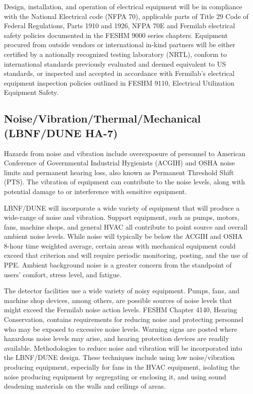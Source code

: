Design, installation, and operation of electrical equipment will be in
compliance with the National Electrical code (NFPA 70), applicable
parts of Title 29 Code of Federal Regulations, Parts 1910 and 1926,
NFPA 70E and Fermilab electrical safety policies documented in the
FESHM 9000 series chapters. Equipment procured from outside vendors or
international in-kind partners will be either certified by a
nationally recognized testing laboratory (NRTL), conform to
international standards previously evaluated and deemed equivalent to
US standards, or inspected and accepted in accordance with Fermilab’s
electrical equipment inspection policies outlined in FESHM 9110,
Electrical Utilization Equipment Safety.


\subsection{Noise/Vibration/Thermal/Mechanical (LBNF/DUNE HA-7)}

Hazards from noise and vibration include overexposure of personnel to
American Conference of Governmental Industrial Hygienists (ACGIH) and
OSHA noise limits and permanent hearing loss, also known as Permanent
Threshold Shift (PTS). The vibration of equipment can contribute to
the noise levels, along with potential damage to or interference with
sensitive equipment.

LBNF/DUNE will incorporate a wide variety of equipment that will
produce a wide-range of noise and vibration. Support equipment, such
as pumps, motors, fans, machine shops, and general HVAC all contribute
to point source and overall ambient noise levels. While noise will
typically be below the ACGIH and OSHA 8-hour time weighted average,
certain areas with mechanical equipment could exceed that criterion
and will require periodic monitoring, posting, and the use of
PPE. Ambient background noise is a greater concern from the standpoint
of users’ comfort, stress level, and fatigue.

The detector facilities use a wide variety of noisy equipment. Pumps,
fans, and machine shop devices, among others, are possible sources of
noise levels that might exceed the Fermilab noise action levels. FESHM
Chapter 4140, Hearing Conservation, contains requirements for reducing
noise and protecting personnel who may be exposed to excessive noise
levels. Warning signs are posted where hazardous noise levels may
arise, and hearing protection devices are readily
available. Methodologies to reduce noise and vibration will be
incorporated into the LBNF/DUNE design. These techniques include using
low noise/vibration producing equipment, especially for fans in the
HVAC equipment, isolating the noise producing equipment by segregating
or enclosing it, and using sound deadening materials on the walls and
ceilings of areas.


